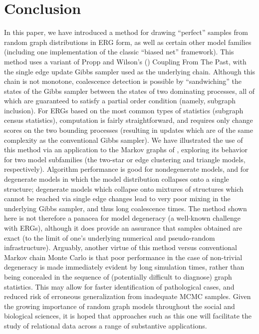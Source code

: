 \documentclass[11pt]{article}
\begin{document}
\section{Conclusion}

In this paper, we have introduced a method for drawing ``perfect'' samples from random graph distributions in ERG form, as well as certain other model families (including one implementation of the classic ``biased net'' framework).  This method uses a variant of Propp and Wilson's (\citeyear{propp.wilson:rsa:1996}) Coupling From The Past, with the single edge update Gibbs sampler used as the underlying chain.  Although this chain is not monotone, coalescence detection is possible by ``sandwiching'' the states of the Gibbs sampler between the states of two dominating processes, all of which are guaranteed to satisfy a partial order condition (namely, subgraph inclusion).  For ERGs based on the most common types of statistics (subgraph census statistics), computation is fairly straightforward, and requires only change scores on the two bounding processes (resulting in updates which are of the same complexity as the conventional Gibbs sampler).  We have illustrated the use of this method via an application to the Markov graphs of \citet{frank.strauss:jasa:1986}, exploring its behavior for two model subfamilies (the two-star or edge clustering and triangle models, respectively).  Algorithm performance is good for nondegenerate models, and for degenerate models in which the model distribution collapses onto a single structure; degenerate models which collapse onto mixtures of structures which cannot be reached via single edge changes lead to very poor mixing in the underlying Gibbs sampler, and thus long coalescence times.  The method shown here is not therefore a panacea for model degeneracy (a well-known challenge with ERGs), although it does provide an assurance that samples obtained are exact (to the limit of one's underlying numerical and pseudo-random infrastructure).  Arguably, another virtue of this method versus conventional Markov chain Monte Carlo is that poor performance in the case of non-trivial degeneracy is made immediately evident by long simulation times, rather than being concealed in the sequence of (potentially difficult to diagnose) graph statistics.  This may allow for faster identification of pathological cases, and reduced risk of erroneous generalization from inadequate MCMC samples.  Given the growing importance of random graph models throughout the social and biological sciences, it is hoped that approaches such as this one will facilitate the study of relational data across a range of substantive applications.





\end{document}
